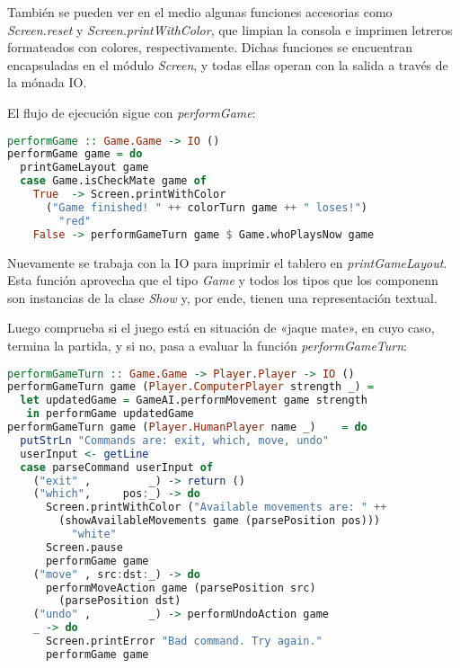 \documentclass{llncs}
\begin{document}
También se pueden ver en el medio algunas funciones accesorias como \textit{Screen.reset} y \textit{Screen.printWithColor}, que limpian la consola e imprimen letreros formateados con colores, respectivamente. Dichas funciones se encuentran encapsuladas en el módulo \textit{Screen}, y todas ellas operan con la salida a través de la mónada IO.

El flujo de ejecución sigue con \textit{performGame}:

\begin{lstlisting}[frame=single, language=haskell, captionpos=b, caption=Función performGame, label={lst:perform_game}]
performGame :: Game.Game -> IO ()
performGame game = do
  printGameLayout game
  case Game.isCheckMate game of
    True  -> Screen.printWithColor
      ("Game finished! " ++ colorTurn game ++ " loses!")
        "red"
    False -> performGameTurn game $ Game.whoPlaysNow game
\end{lstlisting}

Nuevamente se trabaja con la IO para imprimir el tablero en \textit{printGameLayout}. Esta función aprovecha que el tipo \textit{Game} y todos los tipos que los componenn son instancias de la clase \textit{Show} y, por ende, tienen una representación textual.

Luego comprueba si el juego está en situación de «jaque mate», en cuyo caso, termina la partida, y si no, pasa a evaluar la función \textit{performGameTurn}:

\begin{lstlisting}[frame=single, language=haskell, captionpos=b, caption=Función performGameTurn, label={lst:perform_game_turn}]
performGameTurn :: Game.Game -> Player.Player -> IO ()
performGameTurn game (Player.ComputerPlayer strength _) =
  let updatedGame = GameAI.performMovement game strength
   in performGame updatedGame
performGameTurn game (Player.HumanPlayer name _)    = do
  putStrLn "Commands are: exit, which, move, undo"
  userInput <- getLine
  case parseCommand userInput of
    ("exit" ,         _) -> return ()
    ("which",     pos:_) -> do
      Screen.printWithColor ("Available movements are: " ++
        (showAvailableMovements game (parsePosition pos)))
          "white"
      Screen.pause
      performGame game
    ("move" , src:dst:_) -> do
      performMoveAction game (parsePosition src)
        (parsePosition dst)
    ("undo" ,         _) -> performUndoAction game
    _ -> do
      Screen.printError "Bad command. Try again."
      performGame game
\end{lstlisting}
\end{document}

